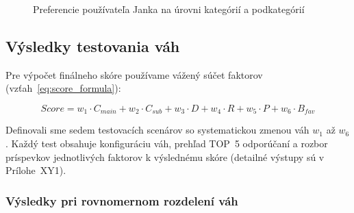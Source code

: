 \documentclass[12pt,a4paper]{article}
\begin{document}
\begin{figure}[H]
\centering
\begin{minipage}{0.48\textwidth}
    \centering
    \caption{Hlavné kategórie}
\end{minipage}
\hfill
\begin{minipage}{0.48\textwidth}
    \centering
    \caption{Podkategórie}
\end{minipage}
\caption{Preferencie používateľa Janka na úrovni kategórií a podkategórií}
\label{fig:porovnanie_grafov}
\end{figure}

\subsection{Výsledky testovania váh}

Pre výpočet finálneho skóre používame vážený súčet faktorov
(vzťah~\ref{eq:score_formula}):

\begin{equation}
Score = w_1 \cdot C_{main} + w_2 \cdot C_{sub} + w_3 \cdot D + w_4 \cdot R + w_5 \cdot P + w_6 \cdot B_{fav}
\label{eq:score_formula}
\end{equation}

Definovali sme sedem testovacích scenárov so systematickou zmenou váh $w_1$
až $w_6$. Každý test obsahuje konfiguráciu váh, prehľad TOP~5 odporúčaní a rozbor
príspevkov jednotlivých faktorov k výslednému skóre (detailné výstupy sú
v Prílohe~XY1).

\subsubsection{Výsledky pri rovnomernom rozdelení váh}
\end{document}

